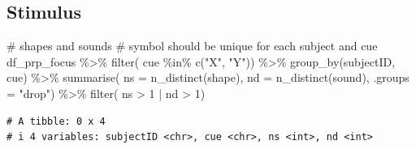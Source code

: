 \documentclass[
  letterpaper,
  DIV=11,
  numbers=noendperiod]{scrartcl}
\newenvironment{Shaded}{\begin{snugshade}}{\end{snugshade}}
\newcommand{\AttributeTok}[1]{\textcolor[rgb]{0.40,0.45,0.13}{#1}}
\newcommand{\CommentTok}[1]{\textcolor[rgb]{0.37,0.37,0.37}{#1}}
\newcommand{\DecValTok}[1]{\textcolor[rgb]{0.68,0.00,0.00}{#1}}
\newcommand{\FunctionTok}[1]{\textcolor[rgb]{0.28,0.35,0.67}{#1}}
\newcommand{\NormalTok}[1]{\textcolor[rgb]{0.00,0.23,0.31}{#1}}
\newcommand{\SpecialCharTok}[1]{\textcolor[rgb]{0.37,0.37,0.37}{#1}}
\newcommand{\StringTok}[1]{\textcolor[rgb]{0.13,0.47,0.30}{#1}}
\begin{document}
\subsection{Stimulus}\label{stimulus}

\begin{Shaded}
\begin{Highlighting}[]
\CommentTok{\# shapes and sounds}
\CommentTok{\# symbol should be unique for each subject and cue}
\NormalTok{df\_prp\_focus }\SpecialCharTok{\%\textgreater{}\%}
  \FunctionTok{filter}\NormalTok{( cue }\SpecialCharTok{\%in\%} \FunctionTok{c}\NormalTok{(}\StringTok{"X"}\NormalTok{, }\StringTok{"Y"}\NormalTok{)) }\SpecialCharTok{\%\textgreater{}\%}
  \FunctionTok{group\_by}\NormalTok{(subjectID, cue) }\SpecialCharTok{\%\textgreater{}\%}
  \FunctionTok{summarise}\NormalTok{( }\AttributeTok{ns =} \FunctionTok{n\_distinct}\NormalTok{(shape), }\AttributeTok{nd =} \FunctionTok{n\_distinct}\NormalTok{(sound), }\AttributeTok{.groups =} \StringTok{"drop"}\NormalTok{) }\SpecialCharTok{\%\textgreater{}\%}
  \FunctionTok{filter}\NormalTok{( ns }\SpecialCharTok{\textgreater{}} \DecValTok{1} \SpecialCharTok{|}\NormalTok{ nd }\SpecialCharTok{\textgreater{}} \DecValTok{1}\NormalTok{) }
\end{Highlighting}
\end{Shaded}

\begin{verbatim}
# A tibble: 0 x 4
# i 4 variables: subjectID <chr>, cue <chr>, ns <int>, nd <int>
\end{verbatim}
\end{document}
